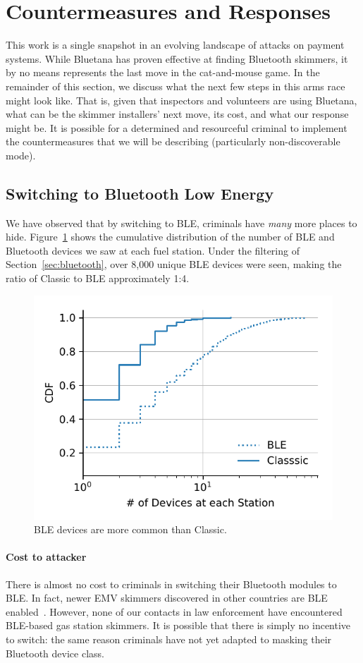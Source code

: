 \section{Countermeasures and Responses}
\label{sec:hiding}
This work is a single snapshot in an evolving landscape of attacks on payment systems. While Bluetana has
proven effective at finding Bluetooth skimmers, it by no means represents the last move in the cat-and-mouse game. In
the remainder of this section, we discuss what the next few steps in this arms race might look like. That is, given
that inspectors and volunteers are using Bluetana, what can be the skimmer installers' next move, its cost, and what our
response might be. It is possible for a determined and resourceful criminal to implement the countermeasures that we will be describing (particularly non-discoverable mode).


\subsection{Switching to Bluetooth Low Energy}
\label{sec:hiding:ble}

We have observed that by switching to BLE, criminals have \emph{many} more places to hide.
%
Figure~\ref{fig:classic-v-ble} shows the cumulative distribution of the number of BLE and Bluetooth devices we saw at each
fuel station.
%
Under the filtering of Section~\ref{sec:bluetooth}, over 8,000 unique BLE devices were seen, making
the ratio of Classic to BLE approximately 1:4.

\begin{figure}
    \centering
    \includegraphics[width=0.6\linewidth]{skimmer/plots/cdf_num_devices_seen.pdf}
    \caption{BLE devices are more common than Classic.}
    \label{fig:classic-v-ble}
    \vspace{-1em}
\end{figure}

\paragraph{Cost to attacker} There is almost no cost to criminals in switching their Bluetooth modules to BLE.
%
In fact, newer EMV skimmers discovered in other countries are BLE enabled~\cite{krebshimmer}.
%
However, none of our contacts in law enforcement have encountered BLE-based gas station skimmers.
%
It is possible that there is simply no incentive to switch: the same reason criminals have not yet adapted to
masking their Bluetooth device class.

